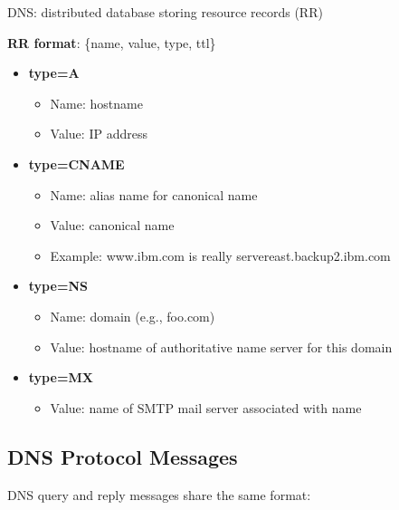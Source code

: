 \documentclass[12pt]{article}
\begin{document}
DNS: distributed database storing resource records (RR)

\textbf{RR format}: \{name, value, type, ttl\}

\begin{itemize}
    \item \textbf{type=A}
          \begin{itemize}
              \item Name: hostname
              \item Value: IP address
          \end{itemize}

    \item \textbf{type=CNAME}
          \begin{itemize}
              \item Name: alias name for canonical name
              \item Value: canonical name
              \item Example: www.ibm.com is really servereast.backup2.ibm.com
          \end{itemize}

    \item \textbf{type=NS}
          \begin{itemize}
              \item Name: domain (e.g., foo.com)
              \item Value: hostname of authoritative name server for this domain
          \end{itemize}

    \item \textbf{type=MX}
          \begin{itemize}
              \item Value: name of SMTP mail server associated with name
          \end{itemize}
\end{itemize}

\subsection{DNS Protocol Messages}

DNS query and reply messages share the same format:
\end{document}
